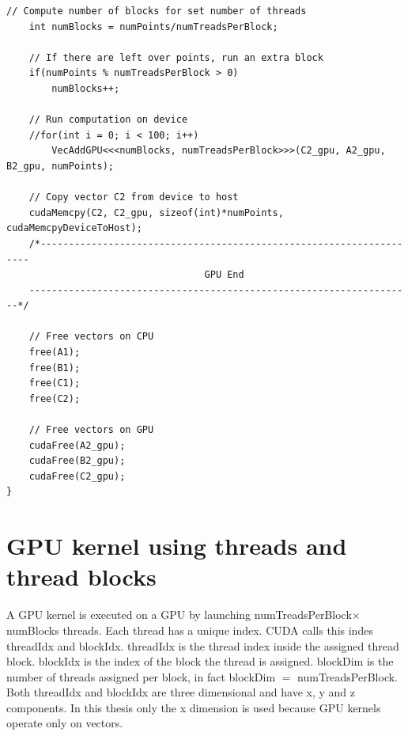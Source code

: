 \begin{lstlisting}[caption={Comparison of CPU verse GPU code.},label={code:GPUvsCPU}]
	// Compute number of blocks for set number of threads
	int numBlocks = numPoints/numTreadsPerBlock;

	// If there are left over points, run an extra block
	if(numPoints % numTreadsPerBlock > 0)
		numBlocks++;

	// Run computation on device
	//for(int i = 0; i < 100; i++)
		VecAddGPU<<<numBlocks, numTreadsPerBlock>>>(C2_gpu, A2_gpu, B2_gpu, numPoints);

	// Copy vector C2 from device to host
	cudaMemcpy(C2, C2_gpu, sizeof(int)*numPoints, cudaMemcpyDeviceToHost);
	/*--------------------------------------------------------------------
                               	   GPU End
	--------------------------------------------------------------------*/

	// Free vectors on CPU
	free(A1);
	free(B1);
	free(C1);
	free(C2);

	// Free vectors on GPU
	cudaFree(A2_gpu);
	cudaFree(B2_gpu);
	cudaFree(C2_gpu);
}
\end{lstlisting}
\doublespacing

\section{GPU kernel using threads and thread blocks}
A GPU kernel is executed on a GPU by launching numTreadsPerBlock$\times$numBlocks 
threads.
Each thread has a unique index.
CUDA calls this indes threadIdx and blockIdx.
threadIdx is the thread index inside the assigned thread block.
blockIdx is the index of the block the thread is assigned.
blockDim is the number of threads assigned per block, in fact blockDim $=$ numTreadsPerBlock.
Both threadIdx and blockIdx are three dimensional and have x, y and z components.
In this thesis only the x dimension is used because GPU kernels operate only on vectors.


